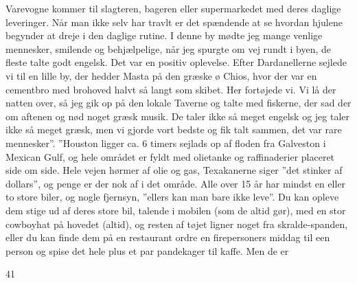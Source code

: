 Varevogne kommer til slagteren, bageren eller supermarkedet med deres
daglige leveringer. Når man ikke selv har travlt er det spændende at se
hvordan hjulene begynder at dreje i den daglige rutine. I denne by mødte
jeg mange venlige mennesker, smilende og behjælpelige, når jeg spurgte
om vej rundt i byen, de fleste talte godt engelsk. Det var en positiv
oplevelse. Efter Dardanellerne sejlede vi til en lille by, der hedder
Masta på den græske ø Chios, hvor der var en cementbro med brohoved
halvt så langt som skibet. Her fortøjede vi. Vi lå der natten over, så
jeg gik op på den lokale Taverne og talte med fiskerne, der sad der om
aftenen og nød noget græsk musik. De taler ikke så meget engelsk og jeg
taler ikke så meget græsk, men vi gjorde vort bedste og fik talt sammen,
det var rare mennesker''. ''Houston ligger ca. 6 timers sejlads op af
floden fra Galveston i Mexican Gulf, og hele området er fyldt med
olietanke og raffinaderier placeret side om side. Hele vejen hørmer af
olie og gas, Texakanerne siger ''det stinker af dollars'', og penge er
der nok af i det område. Alle over 15 år har mindst en eller to store
biler, og nogle fjernsyn, ''ellers kan man bare ikke leve''. Du kan
opleve dem stige ud af deres store bil, talende i mobilen (som de altid
gør), med en stor cowboyhat på hovedet (altid), og resten af tøjet
ligner noget fra skralde-spanden, eller du kan finde dem på en
restaurant ordre en firepersoners middag til een person og spise det
hele plus et par pandekager til kaffe. Men de er

41

